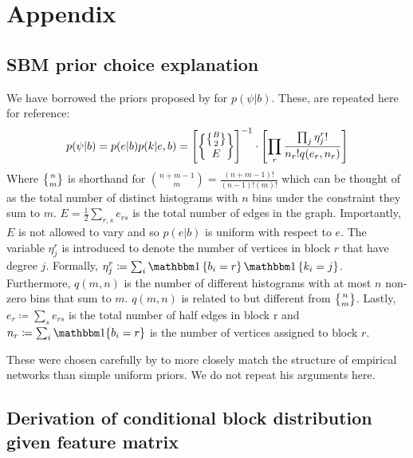 \section{Appendix}

\subsection{SBM prior choice explanation}
\label{appdx:prior}

We have borrowed the priors proposed by \citet{Peixoto-Bayesian-Microcanonical} for $p(\psi | b)$. These, are repeated here for reference:
%
\begin{equation}
	p(\psi | b) = p(e | b) p(k | e, b) = \left[ \specialchoose{ \specialchoose{B}{2} }{ E} \right]^{-1} 
	\cdot \left[ \prod_r \frac{\prod_j \eta_j^r !}{n_r! q(e_r, n_r)} \right]
\end{equation}
%
Where $\specialchoose{n}{m}$ is shorthand for $\binom{n+m-1}{m} = \frac{(n+m-1)!}{(n-1)!(m)!}$ which can be thought of as the total number of distinct histograms with $n$ bins under the constraint they sum to $m$. $E = \frac{1}{2} \sum_{r,s} e_{rs}$ is the total number of edges in the graph. Importantly, $E$ is not allowed to vary and so $p(e|b)$ is uniform with respect to $e$. The variable $\eta_j^r$ is introduced to denote the number of vertices in block $r$ that have degree $j$. Formally, $\eta_j^r \coloneqq \sum_{i} \one\left\{b_i = r \right\} \one \left\{k_i = j \right\}$. Furthermore, $q(m, n)$ is the number of different histograms with at most $n$ non-zero bins that sum to $m$. $q(m, n)$ is related to but different from $\specialchoose{n}{m}$. Lastly, $e_r \coloneqq \sum_{s} e_{rs}$ is the total number of half edges in block r and $n_r \coloneqq \sum_{i} \one\{b_i = r\}$ is the number of vertices assigned to block $r$. 

These were chosen carefully by \citet{Peixoto-Bayesian-Microcanonical} to more closely match the structure of empirical networks than simple uniform priors. We do not repeat his arguments here.

\subsection{Derivation of conditional block distribution given feature matrix}
\label{appdx:b|x}

